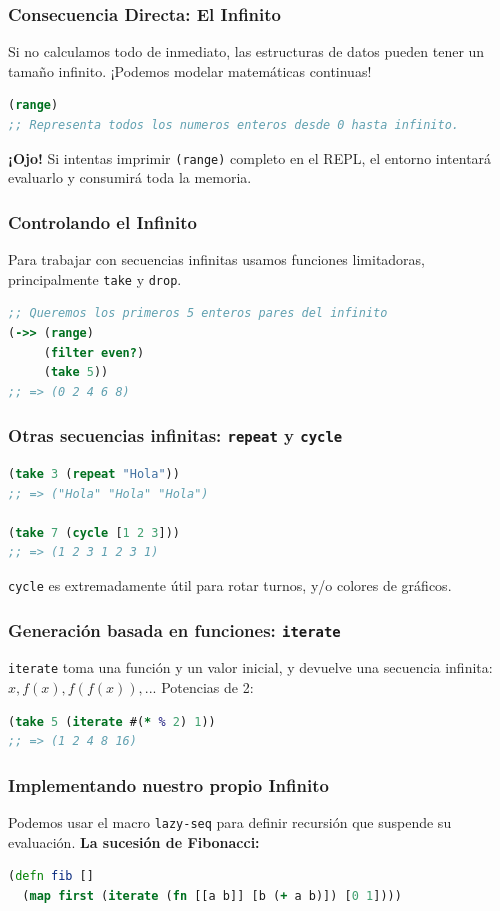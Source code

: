 \documentclass{beamer}
\begin{document}
\begin{frame}[fragile]
    \frametitle{Consecuencia Directa: El Infinito}
    Si no calculamos todo de inmediato, las estructuras de datos pueden tener un tamaño infinito. ¡Podemos modelar matemáticas continuas!
    \begin{lstlisting}[language=Clojure]
(range)
;; Representa todos los numeros enteros desde 0 hasta infinito.
    \end{lstlisting}
    \textbf{¡Ojo!} Si intentas imprimir \texttt{(range)} completo en el REPL, el entorno intentará evaluarlo y consumirá toda la memoria.
\end{frame}

\begin{frame}[fragile]
    \frametitle{Controlando el Infinito}
    Para trabajar con secuencias infinitas usamos funciones limitadoras, principalmente \texttt{take} y \texttt{drop}.
    \begin{lstlisting}[language=Clojure]
;; Queremos los primeros 5 enteros pares del infinito
(->> (range)
     (filter even?)
     (take 5))
;; => (0 2 4 6 8)
    \end{lstlisting}
\end{frame}

\begin{frame}[fragile]
    \frametitle{Otras secuencias infinitas: \texttt{repeat} y \texttt{cycle}}
    \begin{lstlisting}[language=Clojure]
(take 3 (repeat "Hola"))
;; => ("Hola" "Hola" "Hola")

(take 7 (cycle [1 2 3]))
;; => (1 2 3 1 2 3 1)
    \end{lstlisting}
    \texttt{cycle} es extremadamente útil para rotar turnos, y/o colores de gráficos.
\end{frame}

\begin{frame}[fragile]
    \frametitle{Generación basada en funciones: \texttt{iterate}}
    \texttt{iterate} toma una función y un valor inicial, y devuelve una secuencia infinita: $x, f(x), f(f(x)), ...$
    \vspace{0.5cm}
    Potencias de 2:
    \begin{lstlisting}[language=Clojure]
(take 5 (iterate #(* % 2) 1))
;; => (1 2 4 8 16)
    \end{lstlisting}
\end{frame}

\begin{frame}[fragile]
    \frametitle{Implementando nuestro propio Infinito}
    Podemos usar el macro \texttt{lazy-seq} para definir recursión que suspende su evaluación.
    \vspace{0.3cm}
    \textbf{La sucesión de Fibonacci:}
    \begin{lstlisting}[language=Clojure]
(defn fib []
  (map first (iterate (fn [[a b]] [b (+ a b)]) [0 1])))
    \end{lstlisting}
\end{frame}
\end{document}
